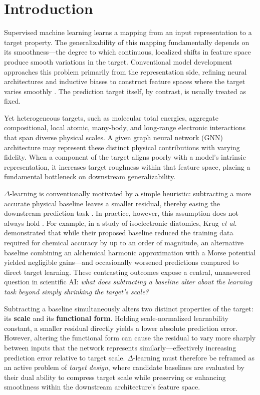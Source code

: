 \section{Introduction}
\label{sec:introduction}

Supervised machine learning learns a mapping from an input representation to a target property. The generalizability of this mapping fundamentally depends on its smoothness—the degree to which continuous, localized shifts in feature space produce smooth variations in the target. Conventional model development approaches this problem primarily from the representation side, refining neural architectures and inductive biases to construct feature spaces where the target varies smoothly \cite{behler2007generalized,bartok2010gap,gasteiger2022gemnetoc,schutt2023schnetpack2,batzner2022nequip}. The prediction target itself, by contrast, is usually treated as fixed.

Yet heterogeneous targets, such as molecular total energies, aggregate compositional, local atomic, many-body, and long-range electronic interactions that span diverse physical scales. A given graph neural network (GNN) architecture may represent these distinct physical contributions with varying fidelity. When a component of the target aligns poorly with a model's intrinsic representation, it increases target roughness within that feature space, placing a fundamental bottleneck on downstream generalizability.

$\Delta$-learning is conventionally motivated by a simple heuristic: subtracting a more accurate physical baseline leaves a smaller residual, thereby easing the downstream prediction task \cite{ramakrishnan2015delta,chen2023solutiondelta,dral2020hierarchical,grumet2024dielectric,chang2025activation}. In practice, however, this assumption does not always hold \cite{atz2022deltaqml}. For example, in a study of isoelectronic diatomics, Krug \emph{et al.}~\cite{krug2025aha} demonstrated that while their proposed baseline reduced the training data required for chemical accuracy by up to an order of magnitude, an alternative baseline combining an alchemical harmonic approximation with a Morse potential yielded negligible gains—and occasionally worsened predictions compared to direct target learning. These contrasting outcomes expose a central, unanswered question in scientific AI: \emph{what does subtracting a baseline alter about the learning task beyond simply shrinking the target's scale?}

Subtracting a baseline simultaneously alters two distinct properties of the target: its \textbf{scale} and its \textbf{functional form}. Holding scale-normalized learnability constant, a smaller residual directly yields a lower absolute prediction error. However, altering the functional form can cause the residual to vary more sharply between inputs that the network represents similarly—effectively increasing prediction error relative to target scale. $\Delta$-learning must therefore be reframed as an active problem of \emph{target design}, where candidate baselines are evaluated by their dual ability to compress target scale while preserving or enhancing smoothness within the downstream architecture's feature space.

